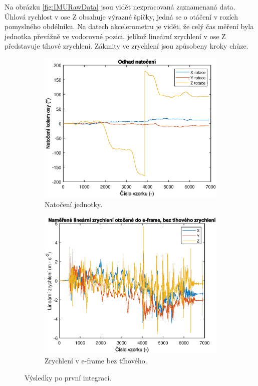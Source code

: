 Na obrázku \ref{fig:IMURawData} jsou vidět nezpracovaná zaznamenaná data. Úhlová rychlost v ose Z obsahuje výrazné špičky, jedná se o otáčení v rozích pomyslného obdélníku. Na datech akcelerometru je vidět, že celý čas měření byla jednotka převážně ve vodorovné pozici, jelikož lineární zrychlení v ose Z představuje tíhové zrychlení. Zákmity ve zrychlení jsou způsobeny kroky chůze.

\begin{figure}[h]
     \centering
     \begin{subfigure}[b]{0.49\textwidth}
         \centering
         \includegraphics[width=\textwidth]{obrazky/matlab/1measOrient}
         \caption{Natočení jednotky.}   
         \label{fig:Rotation}  
     \end{subfigure}
     \hfill
     \centering
     \begin{subfigure}[b]{0.49\textwidth}
         \centering
         \includegraphics[width=\textwidth]{obrazky/matlab/1measAccelEframeWithoutG}
         \caption{Zrychlení v e-frame bez tíhového.}   
         \label{fig:AccelWithoutG}  
     \end{subfigure}

        \caption{Výsledky po první integraci.}
        \label{fig:rotationAccel}
\end{figure}

